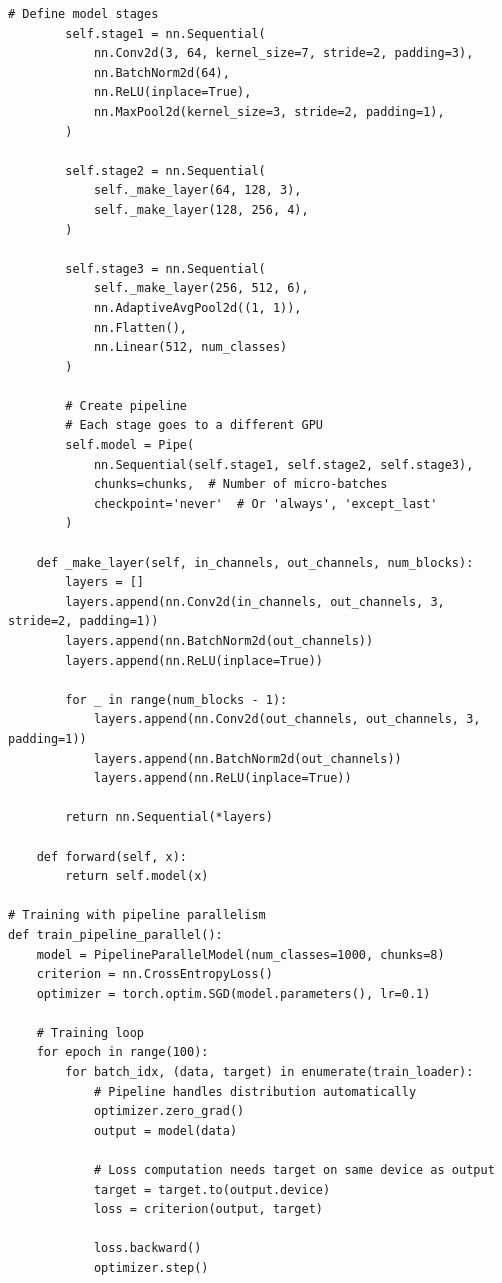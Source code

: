 \begin{lstlisting}[style=python, caption=Model parallelism with pipeline parallelism in PyTorch]
        # Define model stages
        self.stage1 = nn.Sequential(
            nn.Conv2d(3, 64, kernel_size=7, stride=2, padding=3),
            nn.BatchNorm2d(64),
            nn.ReLU(inplace=True),
            nn.MaxPool2d(kernel_size=3, stride=2, padding=1),
        )

        self.stage2 = nn.Sequential(
            self._make_layer(64, 128, 3),
            self._make_layer(128, 256, 4),
        )

        self.stage3 = nn.Sequential(
            self._make_layer(256, 512, 6),
            nn.AdaptiveAvgPool2d((1, 1)),
            nn.Flatten(),
            nn.Linear(512, num_classes)
        )

        # Create pipeline
        # Each stage goes to a different GPU
        self.model = Pipe(
            nn.Sequential(self.stage1, self.stage2, self.stage3),
            chunks=chunks,  # Number of micro-batches
            checkpoint='never'  # Or 'always', 'except_last'
        )

    def _make_layer(self, in_channels, out_channels, num_blocks):
        layers = []
        layers.append(nn.Conv2d(in_channels, out_channels, 3, stride=2, padding=1))
        layers.append(nn.BatchNorm2d(out_channels))
        layers.append(nn.ReLU(inplace=True))

        for _ in range(num_blocks - 1):
            layers.append(nn.Conv2d(out_channels, out_channels, 3, padding=1))
            layers.append(nn.BatchNorm2d(out_channels))
            layers.append(nn.ReLU(inplace=True))

        return nn.Sequential(*layers)

    def forward(self, x):
        return self.model(x)

# Training with pipeline parallelism
def train_pipeline_parallel():
    model = PipelineParallelModel(num_classes=1000, chunks=8)
    criterion = nn.CrossEntropyLoss()
    optimizer = torch.optim.SGD(model.parameters(), lr=0.1)

    # Training loop
    for epoch in range(100):
        for batch_idx, (data, target) in enumerate(train_loader):
            # Pipeline handles distribution automatically
            optimizer.zero_grad()
            output = model(data)

            # Loss computation needs target on same device as output
            target = target.to(output.device)
            loss = criterion(output, target)

            loss.backward()
            optimizer.step()
\end{lstlisting}

